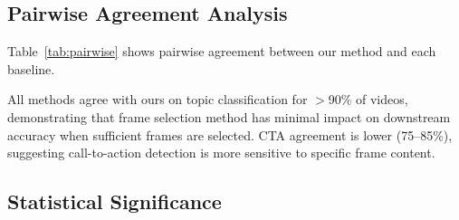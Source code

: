 \documentclass[sigconf,nonacm]{acmart}
\begin{document}

\subsection{Pairwise Agreement Analysis}

Table~\ref{tab:pairwise} shows pairwise agreement between our method and each baseline.

\begin{table}[t]
\centering
\caption{Pairwise agreement between our method and baselines. Topic agreement $>$90\% across all methods indicates semantic equivalence. $N$ = videos with valid extractions from both methods.}
\label{tab:pairwise}
\end{table}

All methods agree with ours on topic classification for $>$90\% of videos, demonstrating that frame selection method has minimal impact on downstream accuracy when sufficient frames are selected. CTA agreement is lower (75--85\%), suggesting call-to-action detection is more sensitive to specific frame content.

\subsection{Statistical Significance}
\end{document}
